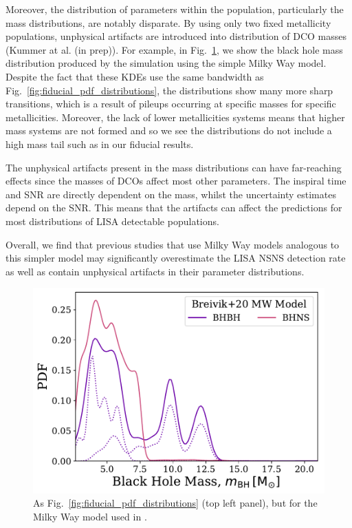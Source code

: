 Moreover, the distribution of parameters within the population, particularly the mass distributions, are notably disparate. By using only two fixed metallicity populations, unphysical artifacts are introduced into distribution of DCO masses (Kummer at al. (in prep)). For example, in Fig.~\ref{fig:bh_mass_simple_mw}, we show the black hole mass distribution produced by the simulation using the simple Milky Way model. Despite the fact that these KDEs use the same bandwidth as Fig.~\ref{fig:fiducial_pdf_distributions}, the distributions show many more sharp transitions, which is a result of pileups occurring at specific masses for specific metallicities. Moreover, the lack of lower metallicities systems means that higher mass systems are not formed and so we see the distributions do not include a high mass tail such as in our fiducial results.

The unphysical artifacts present in the mass distributions can have far-reaching effects since the masses of DCOs affect most other parameters. The inspiral time and SNR are directly dependent on the mass, whilst the uncertainty estimates depend on the SNR. This means that the artifacts can affect the predictions for most distributions of LISA detectable populations.

Overall, we find that previous studies that use Milky Way models analogous to this simpler model may significantly overestimate the LISA NSNS detection rate as well as contain unphysical artifacts in their parameter distributions.

\begin{figure}[h]
    \centering
    \includegraphics[width=\columnwidth]{../figures/BH_mass_dist_simple_mw.pdf}
    \caption{As Fig.~\ref{fig:fiducial_pdf_distributions} (top left panel), but for the Milky Way model used in \citet{Breivik+2020}.}
    \label{fig:bh_mass_simple_mw}
\end{figure}

